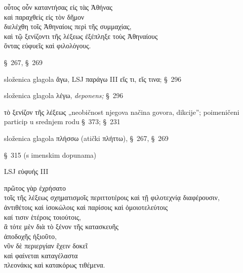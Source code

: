 

{\large
\begin{greek}
\noindent οὗτος οὖν καταντήσας εἰς τὰς Ἀθήνας\\
\tabto{2em} καὶ παραχθεὶς εἰς τὸν δῆμον\\
διελέχθη τοῖς Ἀθηναίοις περὶ τῆς συμμαχίας, \\
καὶ τῷ ξενίζοντι τῆς λέξεως ἐξέπληξε τοὺς Ἀθηναίους \\
\tabto{2em} ὄντας εὐφυεῖς καὶ φιλολόγους.\\

\end{greek}
}

\begin{description}[noitemsep]
\item[καταντήσας] §~267, §~269 
\item[παραχθεὶς] složenica glagola ἄγω, LSJ παράγω III εἴς τι, εἴς τινα; §~296
\item[διελέχθη] složenica glagola λέγω, \textit{deponens;} §~296
\item[τῷ ξενίζοντι] τὸ ξενίζον τῆς λέξεως „neobičnost njegova načina govora, dikcije”; poimeničeni particip u srednjem rodu §~373; §~231
\item[ἐξέπληξε] složenica glagola πλήσσω (atički πλήττω), §~267, §~269
\item[ὄντας] §~315 (s imenskim dopunama)
\item[εὐφυεῖς] LSJ εὐφυής III %

\end{description}



{\large
\begin{greek}
\noindent πρῶτος γὰρ ἐχρήσατο \\
\tabto{2em} τοῖς τῆς λέξεως σχηματισμοῖς περιττοτέροις καὶ τῇ φιλοτεχνίᾳ διαφέρουσιν, \\
\tabto{2em} ἀντιθέτοις καὶ ἰσοκώλοις καὶ παρίσοις καὶ ὁμοιοτελεύτοις \\
\tabto{2em} καί τισιν ἑτέροις τοιούτοις, \\
\tabto{4em} ἃ τότε μὲν διὰ τὸ ξένον τῆς κατασκευῆς \\
\tabto{6em} ἀποδοχῆς ἠξιοῦτο, \\
\tabto{4em} νῦν δὲ περιεργίαν ἔχειν δοκεῖ \\
\tabto{4em} καὶ φαίνεται καταγέλαστα \\
\tabto{6em} πλεονάκις καὶ κατακόρως τιθέμενα.\\

\end{greek}
}

